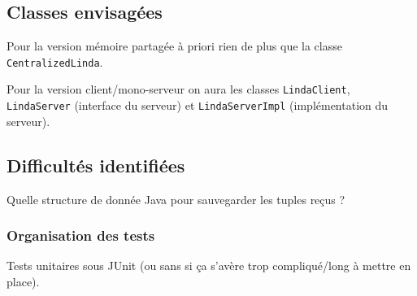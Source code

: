 \documentclass[headings=standardclasses,parskip=half]{scrartcl}
\begin{document}
\subsection*{Classes envisagées}

Pour la version mémoire partagée à priori rien de plus que la classe \texttt{CentralizedLinda}.

Pour la version client/mono-serveur on aura les classes \texttt{LindaClient},
\texttt{LindaServer} (interface du serveur) et \texttt{LindaServerImpl} (implémentation du serveur).

\subsection*{Difficultés identifiées}

Quelle structure de donnée Java pour sauvegarder les tuples reçus ?

\subsubsection*{Organisation des tests}

Tests unitaires sous JUnit (ou sans si ça s'avère trop compliqué/long à mettre en place).
\end{document}
